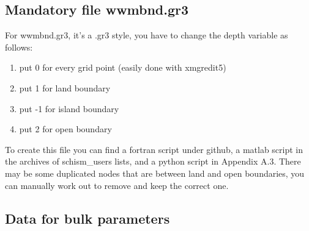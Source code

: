 \documentclass[preprints,briefreport,accept,oneauthor,pdftex]{Definitions/mdpi}
\begin{document}
\subsection{Mandatory file wwmbnd.gr3}
\noindent For wwmbnd.gr3, it's a .gr3 style, you have to change the depth variable as follows:
\begin{enumerate}
    \item put 0 for every grid point (easily done with xmgredit5)
    \item put 1 for land boundary
    \item put -1 for island boundary
    \item put 2 for open boundary
\end{enumerate}
To create this file you can find a fortran script under github, a matlab script in the archives of schism\_users lists, and a python script in Appendix A.3.
There may be some duplicated nodes that are between land and open boundaries, you can manually work out to remove and keep the correct one.\\
\subsection{Data for bulk parameters}
\end{document}
